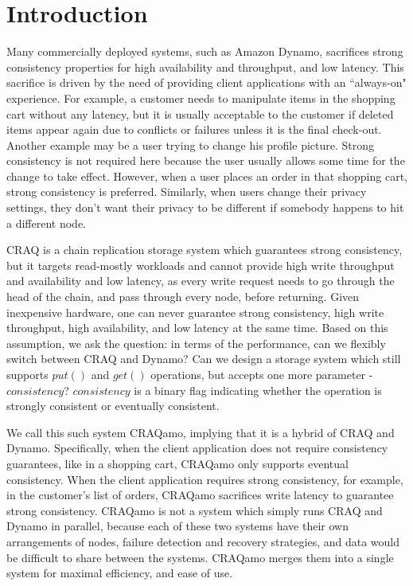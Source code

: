 \section{Introduction}
\label{sec:intro}

Many commercially deployed systems, such as Amazon Dynamo\cite{decandia2007dynamo}, sacrifices strong consistency properties for high availability and throughput, and low latency. This sacrifice is driven by the need of providing client applications with an ``always-on" experience. For example, a customer needs to manipulate items in the shopping cart without any latency, but it is usually acceptable to the customer if deleted items appear again due to conflicts or failures unless it is the final check-out. Another example may be a user trying to change his profile picture. Strong consistency is not required here because the user usually allows some time for the change to take effect. However, when a user places an order in that shopping cart, strong consistency is preferred. Similarly, when users change their privacy settings, they don't want their privacy to be different if somebody happens to hit a different node.

CRAQ\cite{terrace2009object} is a chain replication storage system which guarantees strong consistency, but it targets read-mostly workloads and cannot provide high write throughput and availability and low latency, as every write request needs to go through the head of the chain, and pass through every node, before returning.  Given inexpensive hardware, one can never guarantee strong consistency, high write throughput, high availability, and low latency at the same time. Based on this assumption, we ask the question: in terms of the performance, can we flexibly switch between CRAQ and Dynamo? Can we design a storage system which still supports $put()$ and $get()$ operations, but accepts one more parameter - $consistency$? $consistency$ is a binary flag indicating whether the operation is strongly consistent or eventually consistent.

We call this such system CRAQamo, implying that it is a hybrid of CRAQ and Dynamo. Specifically, when the client application does not require consistency guarantees, like in a shopping cart, CRAQamo only supports eventual consistency. When the client application requires strong consistency, for example, in the customer's list of orders, CRAQamo sacrifices write latency to guarantee strong consistency. CRAQamo is not a system which simply runs CRAQ and Dynamo in parallel, because each of these two systems have their own arrangements of nodes, failure detection and recovery strategies, and data would be difficult to share between the systems. CRAQamo merges them into a single system for maximal efficiency, and ease of use.

